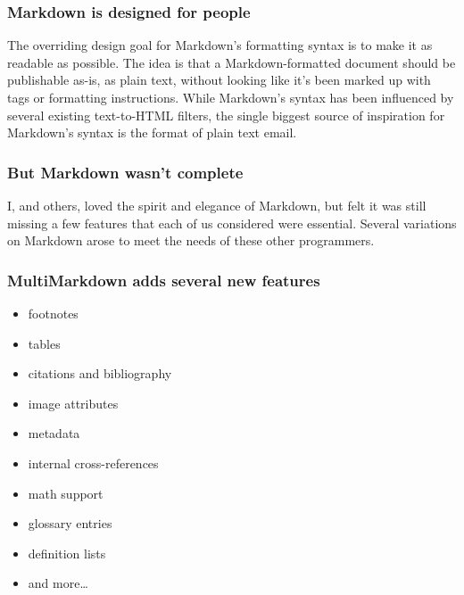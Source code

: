 \documentclass[ignorenonframetext,12pt,aspectratio=169]{beamer}
\begin{document}
\begin{frame}[fragile]
\frametitle{Markdown is designed for people}
\label{markdownisdesignedforpeople}

The overriding design goal for Markdown's formatting syntax is to make it as
readable as possible. The idea is that a Markdown-formatted document should be
publishable as-is, as plain text, without looking like it's been marked up
with tags or formatting instructions. While Markdown's syntax has been
influenced by several existing text-to-HTML filters, the single biggest source
of inspiration for Markdown's syntax is the format of plain text email.
~\citep{gruber}

\end{frame}

\begin{frame}[fragile]
\frametitle{But Markdown wasn't complete}
\label{butmarkdownwasntcomplete}

I, and others, loved the spirit and elegance of Markdown, but felt it was
still missing a few features that each of us considered were essential.
Several variations on Markdown arose to meet the needs of these other
programmers.

\end{frame}

\begin{frame}[fragile]
\frametitle{MultiMarkdown adds several new features}
\label{multimarkdownaddsseveralnewfeatures}

\begin{itemize}
\item footnotes
\item tables
\item citations and bibliography
\item image attributes
\item metadata
\item internal cross-references
\item math support
\item glossary entries
\item definition lists
\item and more{\ldots}
\end{itemize}

\end{frame}
\end{document}
